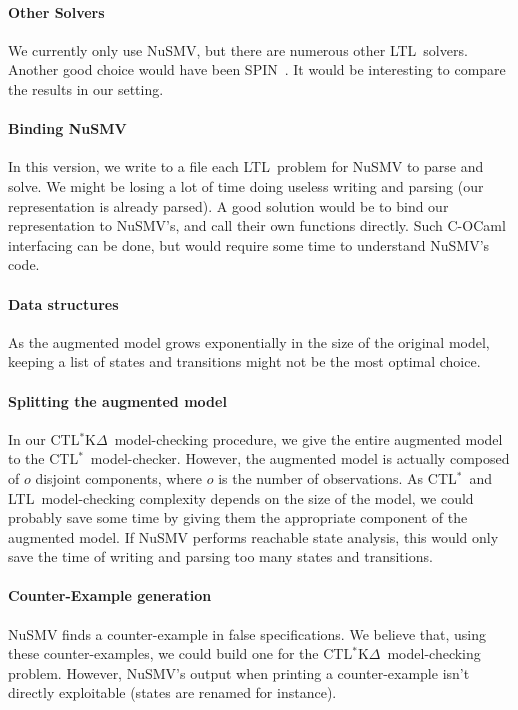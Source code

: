 \documentclass[dvipsnames]{acmart}
\def\ctls{CTL$^{*}$}
\def\ctlskd{CTL$^{*}$K$\Delta$}
\def\ltl{LTL}
\begin{document}
\paragraph{Other Solvers}
We currently only use NuSMV, but there are numerous other \ltl\ solvers. Another good choice would have been SPIN~\cite{spin}.
It would be interesting to compare the results in our setting.

\paragraph{Binding NuSMV}
In this version, we write to a file each \ltl\ problem for NuSMV to parse and solve. We might be losing a lot of time doing useless writing and parsing (our representation is already parsed). A good solution would be to bind our representation to NuSMV's, and call their own functions directly. Such C-OCaml interfacing can be done, but would require some time to understand NuSMV's code.

\paragraph{Data structures}
As the augmented model grows exponentially in the size of the original model, keeping a list of states and transitions might not be the most optimal choice.

\paragraph{Splitting the augmented model}
In our \ctlskd\ model-checking procedure, we give the entire augmented model to the \ctls\ model-checker.
However, the augmented model is actually composed of $o$ disjoint components, where $o$ is the number of observations.
As \ctls\ and \ltl\ model-checking complexity depends on the size of the model, we could probably save some time by giving them the appropriate component of the augmented model. If NuSMV performs reachable state analysis, this would only save the time of writing and parsing too many states and transitions.

\paragraph{Counter-Example generation}
NuSMV finds a counter-example in false specifications. We believe that, using these counter-examples, we could build one for the \ctlskd\ model-checking problem. However, NuSMV's output when printing a counter-example isn't directly exploitable (states are renamed for instance). 
\end{document}
